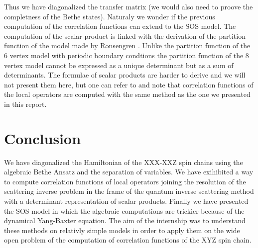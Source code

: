 \documentclass[12pt]{article}
\begin{document}
Thus we have diagonalized the transfer matrix (we would also need to proove the completness of the Bethe states). Naturaly we wonder if the previous computation of the correlation functions can extend to the SOS model. The computation of the scalar product is linked with the derivation of the partition function of the model made by Ronsengren \cite{Ros09}. Unlike the partition function of the 6 vertex model with periodic boundary condtions\cite{Ize87} the partition function of the 8 vertex model cannot be expressed as a unique determinant but as a sum of determinants. The formulae of scalar products are harder to derive and we will not present them here, but one can refer to\cite{LevT13a} and note that correlation functions of the local operators are computed with the same method as the one we presented in this report.
\pagebreak
\section{Conclusion}

We have diagonalized the Hamiltonian of the XXX-XXZ spin chains using the algebraic Bethe Ansatz and the separation of variables. We have exihibited a way to compute correlation functions of local operators joining the resolution of the scattering inverse problem in the frame of the quantum inverse scattering method with a determinant representation of scalar products. Finally we have presented the SOS model in which the algebraic computations are trickier because of the dynamical Yang-Baxter equation. The aim of the internship was to understand these methods on relativly simple models in order to apply them on the wide open problem of the computation of correlation functions of the XYZ spin chain.










\end{document}
